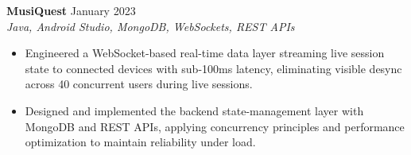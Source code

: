 \documentclass[letterpaper,10.5pt]{article}
\begin{document}
\vspace{4pt}

\textbf{MusiQuest} \hfill January 2023 \\
\textit{Java, Android Studio, MongoDB, WebSockets, REST APIs}
\begin{itemize}[leftmargin=0.2in, itemsep=0pt, topsep=3pt]
  \small
  \item Engineered a WebSocket-based real-time data layer streaming live session state to connected devices with sub-100ms latency, eliminating visible desync across 40 concurrent users during live sessions.
  \item Designed and implemented the backend state-management layer with MongoDB and REST APIs, applying concurrency principles and performance optimization to maintain reliability under load.
\end{itemize}
\end{document}

